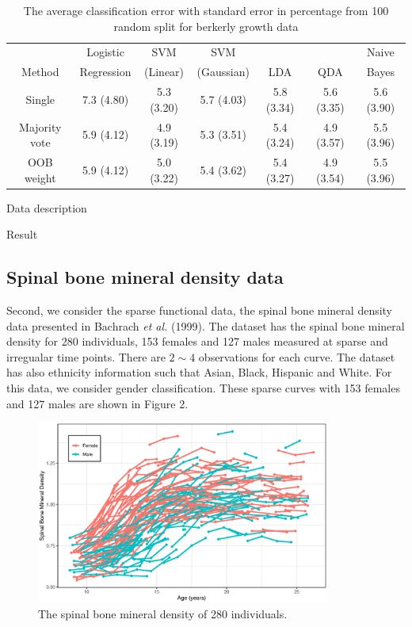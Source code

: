 \documentclass[eng]{csam}
\begin{document}
\begin{table}[ht]
	\footnotesize
	\centering
	\caption{The average classification error with standard error in percentage from 100 random split for berkerly growth data}
	\tabcolsep=11.5pt
	\begin{tabular}{ccccccc}
		\hline \hline
	           & Logistic   & SVM      & SVM        &     &     & Naive \\
		Method & Regression & (Linear) & (Gaussian) & LDA & QDA & Bayes \\ 
		\hline
		Single        & 7.3 (4.80) & 5.3 (3.20) & 5.7 (4.03) & 5.8 (3.34) & 5.6 (3.35) & 5.6 (3.90) \\ 
		Majority vote & 5.9 (4.12) & 4.9 (3.19) & 5.3 (3.51) & 5.4 (3.24) & 4.9 (3.57) & 5.5 (3.96) \\ 
		OOB weight    & 5.9 (4.12) & 5.0 (3.22) & 5.4 (3.62) & 5.4 (3.27) & 4.9 (3.54) & 5.5 (3.96) \\ 
		\hline \hline
	\end{tabular}
\end{table}

{\color{red}
	Data description
	
	Result	
}


\subsection{Spinal bone mineral density data}
Second, we consider the sparse functional data, the spinal bone mineral density data presented in Bachrach {\em et al.} (1999). The dataset has the spinal bone mineral density for 280 individuals, 153 females and 127 males measured at sparse and irregualar time points. There are $2 \sim 4$ observations for each curve. The dataset has also ethnicity information such that Asian, Black, Hispanic and White. For this data, we consider gender classification. These sparse curves with 153 females and 127 males are shown in Figure 2.
\begin{figure}[h]
	\centering
	\includegraphics[height=6cm,keepaspectratio=true]{img/spnbmd.eps}
	\caption{The spinal bone mineral density of 280 individuals.}
	\label{fig:rsxb}
\end{figure}
\end{document}

